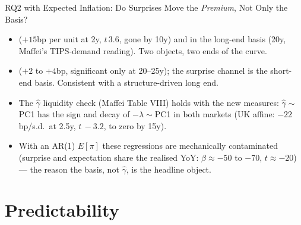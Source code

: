 \begin{frame}[t]{RQ2 with Expected Inflation: Do Surprises Move the \emph{Premium}, Not Only the Basis?}
\vspace{0.12cm}
\raggedright\scriptsize
\begin{itemize}\itemsep=0.05cm\scriptsize
  \item {} ($+15$bp per unit at 2y, $t\,3.6$, gone by 10y)
        and in the long-end basis (20y, Maffei's TIPS-demand reading). Two objects, two ends of the curve.
  \item {} ($+2$ to $+4$bp, significant only at 20--25y); the surprise channel is
        the short-end basis. Consistent with a structure-driven long end.
  \item The $\hat\gamma$ liquidity check (Maffei Table VIII) holds with the new measures: $\hat\gamma\sim$PC1 has the
        sign and decay of $-\lambda\sim$PC1 in both markets (UK affine: $-22$bp/s.d.\ at 2.5y, $t\,{-}3.2$, to zero by 15y).
  \item With an AR(1) $E[\pi]$ these regressions are mechanically contaminated (surprise and expectation
        share the realised YoY: $\beta\approx-50$ to $-70$, $t\approx-20$) --- the reason the basis, not
        $\hat\gamma$, is the headline object.
\end{itemize}
\end{frame}

\section{Predictability}

